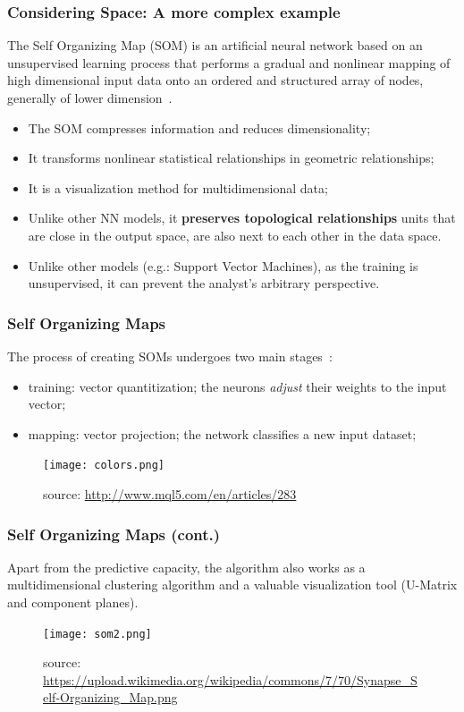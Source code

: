 \documentclass[hyperref={pdfpagelabels=true}]{beamer}
\begin{document}
\begin{frame}
\frametitle{Considering Space: A more complex example}
The Self Organizing Map (SOM) is an artificial neural network based on an unsupervised learning process that performs a gradual and nonlinear mapping of high dimensional input data onto an ordered and structured array of nodes, generally of lower dimension~\cite{gorricha}.
\begin{itemize}
\item <1-> The SOM compresses information and reduces dimensionality;
\item <2-> It transforms nonlinear statistical relationships in geometric relationships;
\item <3-> It is a visualization method for multidimensional data;%
\item <4-> Unlike other NN models, it \textbf{preserves topological relationships} units that are close in the output space, are also next to each other in the data space.%
\item <5-> Unlike other models (e.g.: Support Vector Machines), as the training is unsupervised, it can prevent the analyst's arbitrary perspective.%
\end{itemize}
\end{frame}

\begin{frame}
\frametitle{Self Organizing Maps}
The process of creating SOMs undergoes two main stages~\cite{goat}:
\small{
\begin{itemize}
\item <2-> training: vector quantitization; the neurons \textit{adjust} their weights to the input vector;
\item <3-> mapping: vector projection; the network classifies a new input dataset;
\end{itemize}
}
\begin{figure}
\texttt{[image: colors.png]}
\caption{\tiny{source: \url{http://www.mql5.com/en/articles/283}}}
\end{figure}
\end{frame}

\begin{frame}
\frametitle{Self Organizing Maps (cont.)}
\small{Apart from the predictive capacity, the algorithm also works as a multidimensional clustering algorithm and a valuable visualization tool (U-Matrix and component planes).}
\begin{figure}
\texttt{[image: som2.png]}
\caption{\tiny{source: \url{https://upload.wikimedia.org/wikipedia/commons/7/70/Synapse_Self-Organizing_Map.png}}}
\end{figure}
\end{frame}
\end{document}
